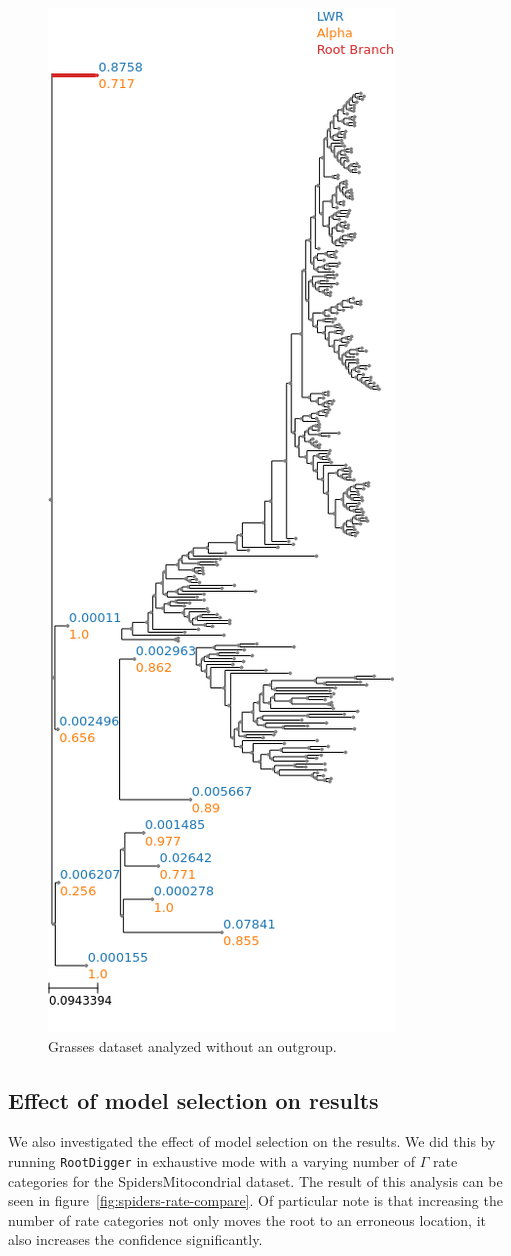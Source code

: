 \documentclass{article}
\newcommand{\RootDiggertt}{\texttt{RootDigger}}
\begin{document}
\begin{figure}
  \begin{center}
    \includegraphics[width=.5\linewidth]{./figs/grasses/plastid245_no_outgroup.png}
    \caption{Grasses dataset analyzed without an outgroup.}
    \label{fig:grasses}
  \end{center}
\end{figure}

\subsection{Effect of model selection on results}

We also investigated the effect of model selection on the results.  We did this
by running \RootDiggertt{} in exhaustive mode with a varying number of $\Gamma$
rate categories for the SpidersMitocondrial dataset. The result of this
analysis can be seen in figure~\ref{fig:spiders-rate-compare}. Of particular
note is that increasing the number of rate categories not only moves the root to
an erroneous location, it also increases the confidence significantly.
\end{document}
